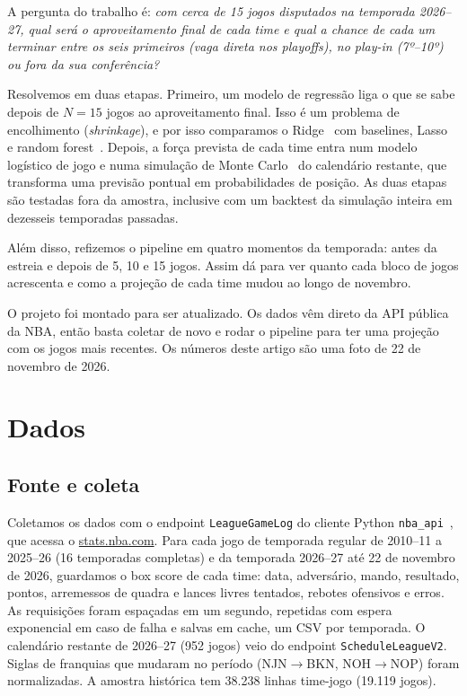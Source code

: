 \documentclass[conference]{IEEEtran}
\begin{document}
A pergunta do trabalho é: \emph{com cerca de 15 jogos disputados na temporada 2026--27, qual será o aproveitamento final de cada time e qual a chance de cada um terminar entre os seis primeiros (vaga direta nos playoffs), no play-in (7º--10º) ou fora da sua conferência?}

Resolvemos em duas etapas. Primeiro, um modelo de regressão liga o que se sabe depois de $N=15$ jogos ao aproveitamento final. Isso é um problema de encolhimento (\emph{shrinkage}), e por isso comparamos o Ridge~\cite{hoerl1970} com baselines, Lasso~\cite{tibshirani1996} e random forest~\cite{breiman2001}. Depois, a força prevista de cada time entra num modelo logístico de jogo e numa simulação de Monte Carlo~\cite{metropolis1949} do calendário restante, que transforma uma previsão pontual em probabilidades de posição. As duas etapas são testadas fora da amostra, inclusive com um backtest da simulação inteira em dezesseis temporadas passadas.

Além disso, refizemos o pipeline em quatro momentos da temporada: antes da estreia e depois de 5, 10 e 15 jogos. Assim dá para ver quanto cada bloco de jogos acrescenta e como a projeção de cada time mudou ao longo de novembro.

O projeto foi montado para ser atualizado. Os dados vêm direto da API pública da NBA, então basta coletar de novo e rodar o pipeline para ter uma projeção com os jogos mais recentes. Os números deste artigo são uma foto de 22 de novembro de 2026.

\section{Dados}
\subsection{Fonte e coleta}
Coletamos os dados com o endpoint \texttt{LeagueGameLog} do cliente Python \texttt{nba\_api}~\cite{nbaapi}, que acessa o \url{stats.nba.com}. Para cada jogo de temporada regular de 2010--11 a 2025--26 (16 temporadas completas) e da temporada 2026--27 até 22 de novembro de 2026, guardamos o box score de cada time: data, adversário, mando, resultado, pontos, arremessos de quadra e lances livres tentados, rebotes ofensivos e erros. As requisições foram espaçadas em um segundo, repetidas com espera exponencial em caso de falha e salvas em cache, um CSV por temporada. O calendário restante de 2026--27 (952 jogos) veio do endpoint \texttt{ScheduleLeagueV2}. Siglas de franquias que mudaram no período (NJN$\to$BKN, NOH$\to$NOP) foram normalizadas. A amostra histórica tem 38.238 linhas time-jogo (19.119 jogos).
\end{document}
